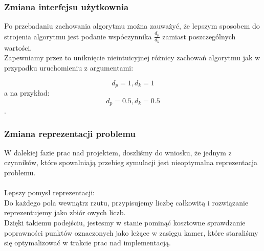 \documentclass[12pt,a4paper]{article}
\begin{document}
\subsubsection{Zmiana interfejsu użytkownia}
Po przebadaniu zachowania algorytmu można zauważyć,
że lepszym sposobem do strojenia algorytmu jest podanie
wspóczynnika $\frac{d_p}{d_k}$ zamiast poszczególnych wartości. \\ 
Zapewniamy przez to uniknięcie nieintuicyjnej różnicy zachowań algorytmu
jak w przypadku uruchomieniu z argumentami:
\begin{center}
\[d_p = 1, d_k = 1\]
a na przykład: \linebreak
\[d_p = 0.5, d_k = 0.5\].
\end{center}
%
\subsubsection{Zmiana reprezentacji problemu}
W dalekiej fazie prac nad projektem, doszliśmy do wniosku,
że jednym z czynników, które spowalniają przebieg symulacji jest nieoptymalna
reprezentacja problemu.\\ \\
Lepszy pomysł reprezentacji: \\
Do każdego pola wewnątrz rzutu, przypisujemy liczbę całkowitą i rozwiązanie
reprezentujemy jako zbiór owych liczb. \\
Dzięki takiemu podejściu, jestesmy w stanie pominąć kosztowne sprawdzanie
poprawności punktów oznaczonych jako leżące w zasięgu kamer,
które staraliśmy się optymalizować w trakcie prac nad implementacją.
\end{document}
